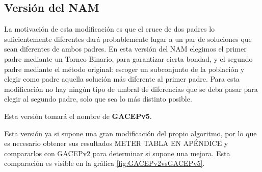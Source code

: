 \subsection{Versión del NAM}

La motivación de esta modificación es que el cruce de dos padres lo suficientemente diferentes dará probablemente lugar a un par de soluciones que sean diferentes de ambos padres. 
En esta versión del NAM elegimos el primer padre mediante un Torneo Binario, para garantizar cierta bondad, y el segundo padre mediante el método original: escoger un subconjunto de la población y elegir como padre aquella solución más diferente al primer padre. 
Para esta modificación no hay ningún tipo de umbral de diferencias que se deba pasar para elegir al segundo padre, solo que sea lo más distinto posible. 

Esta versión tomará el nombre de \textbf{GACEPv5}. 

Esta versión ya si supone una gran modificación del propio algoritmo, por lo que es necesario obtener sus resultados \color{red} METER TABLA EN APÉNDICE \color{black} y compararlos con GACEPv2 para determinar si supone una mejora. 
Esta comparación es visible en la gráfica \ref{fig:GACEPv2vsGACEPv5}.

